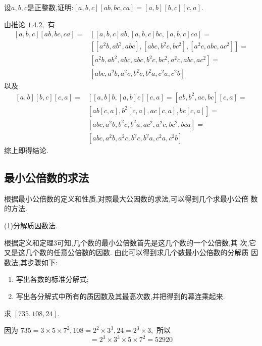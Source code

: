 \example 设$a, b, c$是正整数,证明:$[a, b, c][a b, b c, c a]=[a, b][b, c][c, a]$.

\proof 由推论 $1.4 .2,$ 有
\begin{equation*}
	\begin{split}
		[a, b, c][a b, b c, c a]=&[[a, b, c] a b,[a, b, c] b c,[a, b, c] c a]=\\
		&\left[\left[a^{2} b, a b^{2}, a b c\right],\left[a b c, b^{2} c, b c^{2}\right],\left[a^{2} c, a b c, a c^{2}\right]\right]=\\
		&\left[a^{2} b, a b^{2}, a b c, a b c, b^{2} c, b c^{2}, a^{2} c, a b c, a c^{2}\right]=\\
		&\left[a b c, a^{2} b, a^{2} c, b^{2} c, b^{2} a, c^{2} a, c^{2} b\right]
	\end{split}
\end{equation*}
以及
\begin{equation*}
	\begin{aligned}
		[a, b][b, c][c, a]=&[[a, b] b,[a, b] c][c, a]=\left[a b, b^{2}, a c, b c\right][c, a]=\\
		&\left[a b[c, a], b^{2}[c, a], a c[c, a], b c[c, a]\right]=\\
		&\left[a b c, a^{2} b, b^{2} c, b^{2} a, a c^{2}, a^{2} c, b c^{2}, b c a\right]=\\
		&\left[a b c, a^{2} b, a^{2} c, b^{2} c, b^{2} a, c^{2} a, c^{2} b\right]
	\end{aligned}
\end{equation*}
综上即得结论. 

\subsection{最小公倍数的求法}
根据最小公倍数的定义和性质,对照最大公因数的求法,可以得到几个求最小公倍 数的方法.

(1)分解质因数法. 

根据定义和定理3可知,几个数的最小公倍数首先是这几个数的一个公倍数,其 次,它又是这几个数的任意公倍数的因数. 由此可以得到求几个数最小公倍数的分解质 因数法,其步骤如下:
\begin{enumerate}
	\item 写出各数的标准分解式;
	\item 写出各分解式中所有的质因数及其最高次数,并把得到的幕连乘起来.
\end{enumerate}

\example 求 $[735,108,24]$.

\solve 因为 $735=3 \times 5 \times 7^{2}, 108=2^{2} \times 3^{3}, 24=2^{3} \times 3,$ 所以
\begin{equation*}
	[735,108,24]=2^{3} \times 3^{3} \times 5 \times 7^{2}=52920
\end{equation*}

